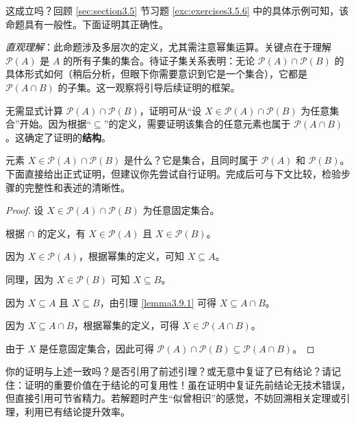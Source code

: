 这成立吗？回顾 \ref{sec:section3.5} 节习题 \ref{exc:exercises3.5.6} 中的具体示例可知，该命题具有一般性。下面证明其正确性。

\emph{直观理解}：此命题涉及多层次的定义，尤其需注意幂集运算。关键点在于理解 $\mathcal{P}(A)$ 是 $A$ 的所有子集的集合。待证子集关系表明：无论 $\mathcal{P}(A) \cap \mathcal{P}(B)$ 的具体形式如何（稍后分析，但眼下你需要意识到它是一个集合），它都是 $\mathcal{P}(A \cap B)$ 的子集。这一观察将引导后续证明的框架。

无需显式计算 $\mathcal{P}(A) \cap \mathcal{P}(B)$，证明可从``设 $X \in \mathcal{P}(A) \cap \mathcal{P}(B)$ 为任意集合''开始。因为根据``$\subseteq$''的定义，需要证明该集合的任意元素也属于 $\mathcal{P}(A \cap B)$。这确定了证明的\textbf{结构}。

元素 $X \in \mathcal{P}(A) \cap \mathcal{P}(B)$ 是什么？它是集合，且同时属于 $\mathcal{P}(A)$ 和 $\mathcal{P}(B)$。下面直接给出正式证明，但建议你先尝试自行证明。完成后可与下文比较，检验步骤的完整性和表述的清晰性。

\begin{proof}
    设 $X \in \mathcal{P}(A) \cap \mathcal{P}(B)$ 为任意固定集合。

    根据 $\cap$ 的定义，有 $X \in \mathcal{P}(A)$ 且 $X \in \mathcal{P}(B)$。

    因为 $X \in \mathcal{P}(A)$，根据幂集的定义，可知 $X \subseteq A$。

    同理，因为 $X \in \mathcal{P}(B)$ 可知 $X \subseteq B$。

    因为 $X \subseteq A$ 且 $X \subseteq B$，由引理 \ref{lemma3.9.1} 可得 $X \subseteq A \cap B$。

    因为 $X \subseteq A \cap B$，根据幂集的定义，可得 $X \in \mathcal{P}(A \cap B)$。

    由于 $X$ 是任意固定集合，因此可得 $\mathcal{P}(A) \cap \mathcal{P}(B) \subseteq \mathcal{P}(A \cap B)$。
\end{proof}

你的证明与上述一致吗？是否引用了前述引理？或无意中复证了已有结论？请记住：证明的重要价值在于结论的可复用性！虽在证明中复证先前结论无技术错误，但直接引用可节省精力。若解题时产生``似曾相识''的感觉，不妨回溯相关定理或引理，利用已有结论提升效率。
